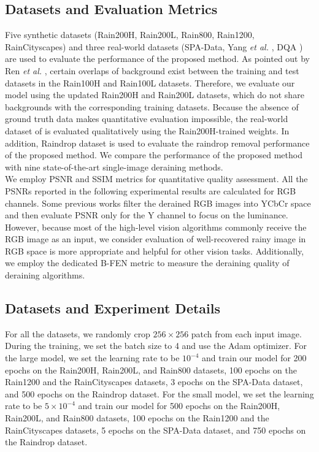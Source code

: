 \documentclass[a4paper,fleqn]{cas-dc}
\begin{document}
\label{sec:exp}






\subsection{Datasets and Evaluation Metrics}



Five synthetic datasets (Rain200H, Rain200L, Rain800, Rain1200, RainCityscapes) and three real-world datasets (SPA-Data, Yang \textit{et al.} \cite{yang2017deep}, DQA \cite{wu2020subjective})  are used to evaluate the performance of the proposed method. As pointed out by Ren \textit{et al.} \cite{ren2019progressive}, certain overlaps of background exist between the training and test datasets in the Rain100H and Rain100L datasets. Therefore, we evaluate our model using the updated Rain200H and Rain200L datasets, which do not share backgrounds with the corresponding training datasets.
Because the absence of ground truth data makes quantitative evaluation impossible, the real-world dataset of \cite{yang2017deep} is evaluated qualitatively using the Rain200H-trained weights. 
In addition, Raindrop \cite{qian2018attentive} dataset is used to evaluate the raindrop removal performance of the proposed method. We compare the performance of the proposed method with nine state-of-the-art single-image deraining methods. \\
We employ PSNR and SSIM \cite{wang2004image} metrics for quantitative quality
assessment. All the PSNRs reported in the following experimental results are calculated for RGB channels. Some previous works filter the derained RGB images into YCbCr space and then evaluate PSNR only for the Y channel to focus on the luminance. However, because most of the high-level vision algorithms commonly receive the RGB image as an input, we consider evaluation of well-recovered rainy image in RGB space is more appropriate and helpful for other vision tasks. Additionally, we employ the dedicated B-FEN metric \cite{wu2020subjective} to measure the deraining quality of deraining algorithms. 



\subsection{Datasets and Experiment Details}

For all the datasets, we randomly crop $256\times256$ patch from each input image. During the training, we set the batch size to 4 and use the Adam optimizer.
For the large model, we set the learning rate to be $10^{-4}$ and train our model for 200 epochs on the Rain200H, Rain200L, and Rain800 datasets, 100 epochs on the Rain1200 and the RainCityscapes datasets, 3 epochs on the SPA-Data dataset, and 500 epochs on the Raindrop dataset. For the small model, we set the learning rate to be $5\times10^{-4}$  and train our model for 500 epochs on the Rain200H, Rain200L, and Rain800 datasets, 100 epochs on the Rain1200 and the RainCityscapes datasets, 5 epochs on the SPA-Data dataset, and 750 epochs on the Raindrop dataset. 
\end{document}
